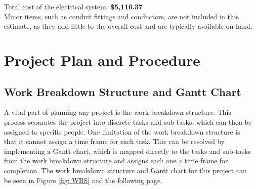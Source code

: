 \documentclass[10pt]{project}
\begin{document}
Total cost of the electrical system: \textbf{\$5,116.37}\\
Minor items, such as conduit fittings and conductors, are not included in this estimate, as they add little to the overall cost and are typically available on hand.


\section{Project Plan and Procedure}



\subsection{Work Breakdown Structure and Gantt Chart} \label{sec:GanttChart}




A vital part of planning any project is the work breakdown structure.  This process separates the project into discrete tasks and sub-tasks, which can then be assigned to specific people.  One limitation of the work breakdown structure is that it cannot assign a time frame for each task.  This can be resolved by implementing a Gantt chart, which is mapped directly to the tasks and sub-tasks from the work breakdown structure and assigns each one a time frame for completion.  The work breakdown structure and Gantt chart for this project can be seen in Figure \ref{fig: WBS} and the following page.
\end{document}
